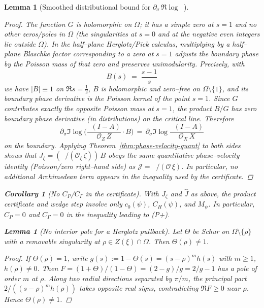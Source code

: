 \documentclass[11pt]{article}
\newtheorem{lemma}[theorem]{Lemma}
\newtheorem{corollary}[theorem]{Corollary}
\theoremstyle{definition}
\theoremstyle{remark}
\DeclareMathOperator{\dettwo}{det_2}
\begin{document}
\begin{lemma}[Smoothed distributional bound for $\partial_\sigma\,\Re\log\dettwo$]
\begin{proof}
The function $G$ is holomorphic on $\Omega$; it has a simple zero at $s=1$ and no other zeros/poles in $\Omega$ (the singularities at $s=0$ and at the negative even integers lie outside $\Omega$). In the half--plane Herglotz/Pick calculus, multiplying by a half--plane Blaschke factor corresponding to a zero at $s=1$ adjusts the boundary phase by the Poisson mass of that zero and preserves unimodularity. Precisely, with
\[
  B(s)\;=\;\frac{s-1}{s}
\]
we have $|B|\equiv 1$ on $\Re s=\tfrac12$, $B$ is holomorphic and zero--free on $\Omega\setminus\{1\}$, and its boundary phase derivative is the Poisson kernel of the point $s=1$. Since $G$ contributes exactly the opposite Poisson mass at $s=1$, the product $B/G$ has zero boundary phase derivative (in distributions) on the critical line. Therefore
\[
  \partial_\sigma\Im\log\Big(\frac{\dettwo(I{-}A)}{\mathcal O_Z\,Z}\cdot B\Big)
  \,=\, \partial_\sigma\Im\log\frac{\dettwo(I{-}A)}{\mathcal O_X\,X}
\]
on the boundary. Applying Theorem~\ref{thm:phase-velocity-quant} to both sides shows that $J_\zeta=(\dettwo/(\mathcal O_\zeta\,\zeta))\,B$ obeys the same quantitative phase--velocity identity (Poisson/zero right--hand side) as $\mathcal J=\dettwo/(\mathcal O\,\xi)$. In particular, no additional Archimedean term appears in the inequality used by the certificate.
\end{proof}


\begin{corollary}[No $C_P$/$C_\Gamma$ in the certificate]
With $J_\zeta$ and $\widehat J$ as above, the product certificate and wedge step involve only $c_0(\psi)$, $C_H(\psi)$, and $M_\psi$. In particular, $C_P=0$ and $C_\Gamma=0$ in the inequality leading to (P+).
\end{corollary}

\begin{lemma}[No interior pole for a Herglotz pullback]\label{lem:no-pole-herglotz}
Let $\Theta$ be Schur on $\Omega\setminus\{\rho\}$ with a removable singularity at $\rho\in Z(\xi)\cap\Omega$. Then $\Theta(\rho)\ne 1$.
\end{lemma}
\begin{proof}
If $\Theta(\rho)=1$, write $g(s):=1-\Theta(s)=(s-\rho)^m h(s)$ with $m\ge1$, $h(\rho)\ne 0$. Then
\(F=(1+\Theta)/(1-\Theta)=(2-g)/g=2/g-1\) has a pole of order $m$ at $\rho$. Along two radial directions separated by $\pi/m$, the principal part $2/((s-\rho)^m h(\rho))$ takes opposite real signs, contradicting $\Re F\ge 0$ near $\rho$. Hence $\Theta(\rho)\ne 1$.
\end{proof}


\end{lemma}
\end{document}
